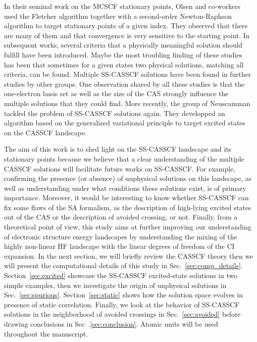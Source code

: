 \documentclass[aps,prb,reprint,showkeys,superscriptaddress]{revtex4-1}
\begin{document}
In their seminal work on the MCSCF stationary points, Olsen and co-workers used the Fletcher algorithm together with a second-order Newton-Raphson algorithm to target stationary points of a given index. \cite{Olsen_1982,Olsen_1983}
They observed that there are many of them and that convergence is very sensitive to the starting point.
In subsequent works, several criteria that a physically meaningful solution should fulfill have been introduced. \cite{Olsen_1983,Golab_1983,Golab_1985,Rizzo_1990}
Maybe the most troubling finding of these studies has been that sometimes for a given states two physical solutions, \ie matching all criteria, can be found. \cite{Rizzo_1990}
Multiple SS-CASSCF solutions have been found in further studies by other groups. \cite{Guihery_1997,Angeli_2003}
One observation shared by all these studies is that the one-electron basis set as well as the size of the CAS strongly influence the multiple solutions that they could find.
More recently, the group of Neuscamman tackled the problem of SS-CASSCF solutions again. They developped an algorithm based on the generalized variational principle to target excited states on the CASSCF landscape. \cite{Tran_2019,Tran_2020,Hanscam_2021}

The aim of this work is to shed light on the SS-CASSCF landscape and its stationary points because we believe that a clear understanding of the multiple CASSCF solutions will facilitate future works on SS-CASSCF.
For example, confirming the presence (or absence) of unphysical solutions on this landscape, as well as understanding under what conditions these solutions exist, is of primary importance.
Moreover, it would be interesting to know whether SS-CASSCF can fix some flaws of the SA formalism, as the description of high-lying excited states out of the CAS or the description of avoided crossing, or not.
Finally, from a theoretical point of view, this study aims at further improving our understanding of electronic structure energy landscapes by understanding the mixing of the highly non-linear HF landscape with the linear degrees of freedom of the CI expansion.
In the next section, we will briefly review the CASSCF theory then we will present the computational details of this study in Sec.~\ref{sec:comp_details}.
Section~\ref{sec:excited} showcase the SS-CASSCF excited-state solutions in two simple examples, then we investigate the origin of unphysical solutions in Sec.~\ref{sec:spurious}.
Section~\ref{sec:static} shows how the solution space evolves in presence of static correlation.
Finally, we look at the behavior of SS-CASSCF solutions in the neighborhood of avoided crossings in Sec.~\ref{sec:avoided} before drawing conclusions in Sec~.\ref{sec:conclusion}.
Atomic units will be used throughout the manuscript.
\end{document}
